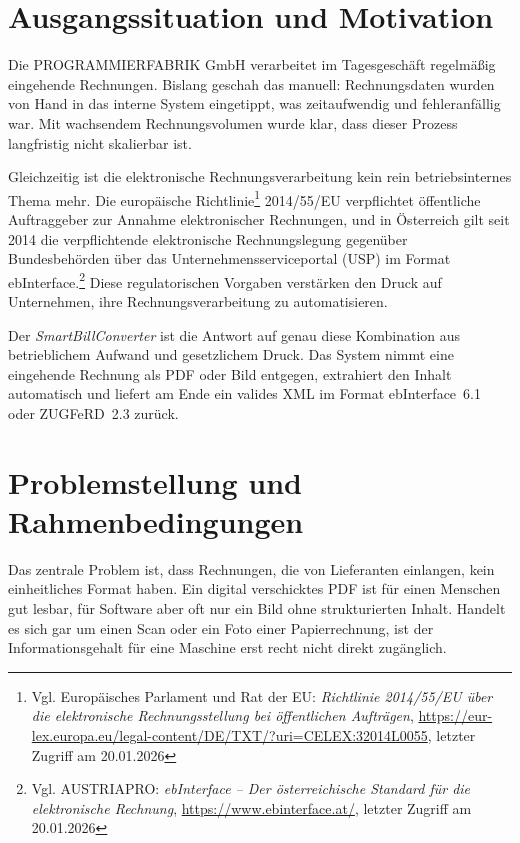 
\section{Ausgangssituation und Motivation}
Die PROGRAMMIERFABRIK GmbH verarbeitet im Tagesgeschäft regelmäßig eingehende Rechnungen.
Bislang geschah das manuell: Rechnungsdaten wurden von Hand in das interne System eingetippt,
was zeitaufwendig und fehleranfällig war. Mit wachsendem Rechnungsvolumen wurde klar,
dass dieser Prozess langfristig nicht skalierbar ist.

Gleichzeitig ist die elektronische Rechnungsverarbeitung kein rein betriebsinternes Thema mehr.
Die europäische Richtlinie\footnote{Vgl. Europäisches Parlament und Rat der EU: \textit{Richtlinie 2014/55/EU über die elektronische Rechnungsstellung bei öffentlichen Aufträgen}, \url{https://eur-lex.europa.eu/legal-content/DE/TXT/?uri=CELEX:32014L0055}, letzter Zugriff am 20.01.2026}
2014/55/EU verpflichtet öffentliche Auftraggeber zur Annahme elektronischer Rechnungen,
und in Österreich gilt seit 2014 die verpflichtende elektronische Rechnungslegung gegenüber
Bundesbehörden über das Unternehmensserviceportal (USP) im Format ebInterface.\footnote{Vgl. AUSTRIAPRO: \textit{ebInterface -- Der österreichische Standard für die elektronische Rechnung}, \url{https://www.ebinterface.at/}, letzter Zugriff am 20.01.2026}
Diese regulatorischen Vorgaben verstärken den Druck auf Unternehmen, ihre Rechnungsverarbeitung
zu automatisieren.

Der \textit{SmartBillConverter} ist die Antwort auf genau diese Kombination aus betrieblichem
Aufwand und gesetzlichem Druck. Das System nimmt eine eingehende Rechnung als PDF oder Bild
entgegen, extrahiert den Inhalt automatisch und liefert am Ende ein valides XML im Format
ebInterface~6.1 oder ZUGFeRD~2.3 zurück.

\section{Problemstellung und Rahmenbedingungen}
Das zentrale Problem ist, dass Rechnungen, die von Lieferanten einlangen, kein einheitliches
Format haben. Ein digital verschicktes PDF ist für einen Menschen gut lesbar, für Software aber
oft nur ein Bild ohne strukturierten Inhalt. Handelt es sich gar um einen Scan oder ein Foto
einer Papierrechnung, ist der Informationsgehalt für eine Maschine erst recht nicht direkt
zugänglich.

